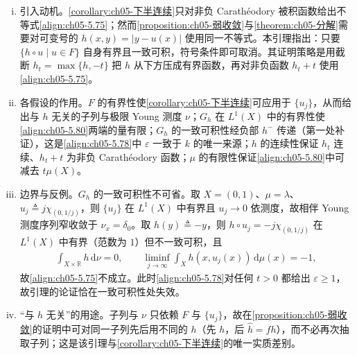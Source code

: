 \documentclass[../../main.tex]{subfiles}
\begin{document}
\begin{remark}\label{remark:ch05-一致可积模不等式}
\begin{enumerate}[(i)]
\item 引入动机。\cref{corollary:ch05-下半连续}只对非负 Carathéodory 被积函数给出不等式\eqref{align:ch05-5.75}；然而\cref{proposition:ch05-弱收敛}与\cref{theorem:ch05-分解}需要对可变号的 $h(x,y)=|y-u(x)|$ 使用同一不等式。本引理指出：只要 $\{h\circ u\mid u\in F\}$ 自身有界且一致可积，符号条件即可取消。其证明策略是用截断 $h_t=\max\{h,-t\}$ 把 $h$ 从下方压成有界函数，再对非负函数 $h_t+t$ 使用\eqref{align:ch05-5.75}。

\item 各假设的作用。$F$ 的有界性使\cref{corollary:ch05-下半连续}可应用于 $\{u_j\}$，从而给出与 $h$ 无关的子列与极限 Young 测度 $\nu$；$G_h$ 在 $L^1(X)$ 中的有界性使\eqref{align:ch05-5.80}两端的量有限；$G_h$ 的一致可积性经负部 $h^-$ 传递（第一处补证），这是\eqref{align:ch05-5.78}中 $\varepsilon$ 一致于 $k$ 的唯一来源；$h$ 的连续性保证 $h_t$ 连续、$h_t+t$ 为非负 Carathéodory 函数；$\mu$ 的有限性保证\eqref{align:ch05-5.80}中可减去 $t\mu(X)$。

\item 边界与反例。$G_h$ 的一致可积性不可省。取 $X=(0,1)$、$\mu=\lambda$、$u_j\triangleq j\chi_{(0,1/j)}$，则 $\{u_j\}$ 在 $L^1(X)$ 中有界且 $u_j\to0$ 依测度，故相伴 Young 测度序列窄收敛于 $\nu_x=\delta_0$。取 $h(y)\triangleq-y$，则 $h\circ u_j=-j\chi_{(0,1/j)}$ 在 $L^1(X)$ 中有界（范数为 $1$）但不一致可积，且
\begin{align*}
\int_{X\times\mathbb{R}}h\,\mathrm{d}\nu=0,\qquad
\liminf_{j\to\infty}\int_Xh(x,u_j(x))\,\mathrm{d}\mu(x)=-1,
\end{align*}
故\eqref{align:ch05-5.75}不成立。此时\eqref{align:ch05-5.78}对任何 $t>0$ 都给出 $\varepsilon\geqslant1$，故引理的论证恰在一致可积性处失效。

\item “与 $h$ 无关”的用途。子列与 $\nu$ 只依赖 $F$ 与 $\{u_j\}$，故在\cref{proposition:ch05-弱收敛}的证明中可对同一子列先后用不同的 $h$（先 $h$，后 $\hat h=fh$），而不必再次抽取子列；这是该引理与\cref{corollary:ch05-下半连续}的唯一实质差别。
\end{enumerate}
\end{remark}
\end{document}
